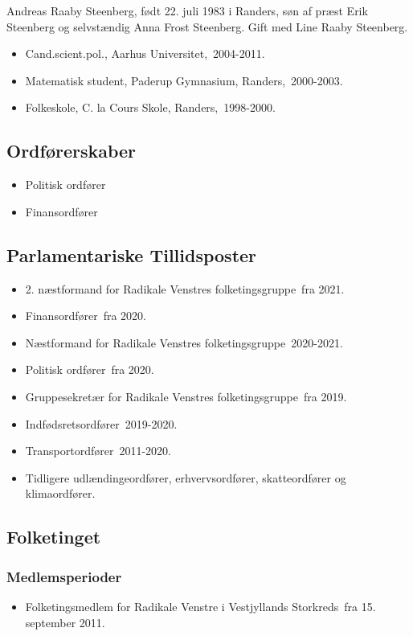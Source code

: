 \documentclass[11pt, a4paper]{awesome-cv}
\begin{document}
\makecvheader[R]
\makelettertitle
\begin{cvletter}
Andreas Raaby Steenberg, født 22. juli 1983 i Randers, søn af præst Erik Steenberg og selvstændig Anna Frost Steenberg. Gift med Line Raaby Steenberg.

\begin{itemize}
\item Cand.scient.pol., Aarhus Universitet, 2004-2011.
\item Matematisk student, Paderup Gymnasium, Randers, 2000-2003.
\item Folkeskole, C. la Cours Skole, Randers, 1998-2000.
\end{itemize}
\subsection*{Ordførerskaber}
\begin{itemize}
\item Politisk ordfører
\item Finansordfører
\end{itemize}
\subsection*{Parlamentariske Tillidsposter}
\begin{itemize}
\item 2. næstformand for Radikale Venstres folketingsgruppe fra 2021.
\item Finansordfører fra 2020.
\item Næstformand for Radikale Venstres folketingsgruppe 2020-2021.
\item Politisk ordfører fra 2020.
\item Gruppesekretær for Radikale Venstres folketingsgruppe fra 2019.
\item Indfødsretsordfører 2019-2020.
\item Transportordfører 2011-2020.
\item Tidligere udlændingeordfører, erhvervsordfører, skatteordfører og klimaordfører.
\end{itemize}
\subsection*{Folketinget}
\subsubsection*{Medlemsperioder}
\begin{itemize}
\item Folketingsmedlem for Radikale Venstre i Vestjyllands Storkreds fra 15. september 2011.
\end{itemize}

\end{cvletter}
\end{document}
